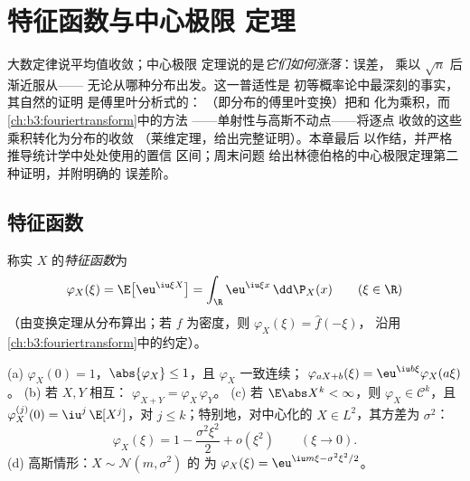 \chapter{特征函数与中心极限
定理}\label{ch:b3:clt}

大数定律说平均值收敛；中心极限
定理说的是\emph{它们如何涨落}：误差，
乘以 $\sqrt n$ 后渐近服从——
无论从哪种分布出发。这一普适性是
初等概率论中最深刻的事实，其自然的证明
是傅里叶分析式的：\emph{}
（即分布的傅里叶变换）把和
化为乘积，而\cref{ch:b3:fouriertransform}中的方法
——单射性与高斯不动点——将逐点
收敛的这些乘积转化为分布的收敛
（莱维定理，给出完整证明）。本章最后
以作结，并严格推导统计学中处处使用的置信
区间；周末问题
给出林德伯格的中心极限定理第二种证明，并附明确的
误差阶。

\section{特征函数}

\begin{definition}\label{def:b3:clt:cf}
称实 $X$ 的\emph{特征函数}为
\[
\varphi_X(\xi) = \E\bigl[\eu^{\iu\xi X}\bigr]
= \int_\R \eu^{\iu\xi x}\,\dd\P_X(x)
\qquad (\xi \in \R)
\]
（由变换定理从分布算出；若
$f$ 为密度，则 $\varphi_X(\xi) = \hat f(-\xi)$，
沿用\cref{ch:b3:fouriertransform}中的约定）。
\end{definition}

\begin{proposition}\label{prop:b3:clt:cfbasics}
(a) $\varphi_X(0) = 1$，$\abs{\varphi_X} \leq 1$，且
$\varphi_X$ 一致连续；
$\varphi_{aX + b}(\xi) = \eu^{\iu b\xi}\varphi_X(a\xi)$。
(b) 若 $X, Y$ 相互\emph{}：
$\varphi_{X+Y} = \varphi_X\,\varphi_Y$。
(c) 若 $\E\abs X^k < \infty$，则 $\varphi_X \in \mathcal
C^k$，且 $\varphi_X^{(j)}(0) = \iu^j\,\E[X^j]$，对 $j \leq
k$；特别地，对中心化的 $X \in L^2$，其方差为
$\sigma^2$：
\[
\varphi_X(\xi) = 1 - \frac{\sigma^2\xi^2}{2} +
o(\xi^2) \qquad (\xi \to 0).
\]
(d) 高斯情形：$X \sim \mathcal N(m, \sigma^2)$ 的
为 $\varphi_X(\xi) = \eu^{\iu m\xi - \sigma^2\xi^2/2}$。
\end{proposition}

